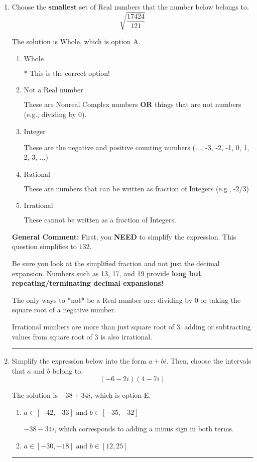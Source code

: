 \documentclass{extbook}[14pt]
\newcommand{\litem}[1]{\item #1

\rule{\textwidth}{0.4pt}}
\begin{document}
\begin{enumerate}\litem{
Choose the \textbf{smallest} set of Real numbers that the number below belongs to.
\[ \sqrt{\frac{17424}{121}} \]

The solution is \( \text{Whole} \), which is option A.\begin{enumerate}[label=\Alph*.]
\item \( \text{Whole} \)

* This is the correct option!
\item \( \text{Not a Real number} \)

These are Nonreal Complex numbers \textbf{OR} things that are not numbers (e.g., dividing by 0).
\item \( \text{Integer} \)

These are the negative and positive counting numbers (..., -3, -2, -1, 0, 1, 2, 3, ...)
\item \( \text{Rational} \)

These are numbers that can be written as fraction of Integers (e.g., -2/3)
\item \( \text{Irrational} \)

These cannot be written as a fraction of Integers.
\end{enumerate}

\textbf{General Comment:} First, you \textbf{NEED} to simplify the expression. This question simplifies to $132$. 
 
 Be sure you look at the simplified fraction and not just the decimal expansion. Numbers such as 13, 17, and 19 provide \textbf{long but repeating/terminating decimal expansions!} 
 
 The only ways to *not* be a Real number are: dividing by 0 or taking the square root of a negative number. 
 
 Irrational numbers are more than just square root of 3: adding or subtracting values from square root of 3 is also irrational.
}
\litem{
Simplify the expression below into the form $a+bi$. Then, choose the intervals that $a$ and $b$ belong to.
\[ (-6 - 2 i)(4 - 7 i) \]

The solution is \( -38 + 34 i \), which is option E.\begin{enumerate}[label=\Alph*.]
\item \( a \in [-42, -33] \text{ and } b \in [-35, -32] \)

 $-38 - 34 i$, which corresponds to adding a minus sign in both terms.
\item \( a \in [-30, -18] \text{ and } b \in [12, 25] \)


\end{enumerate}}
\end{enumerate}
\end{document}
